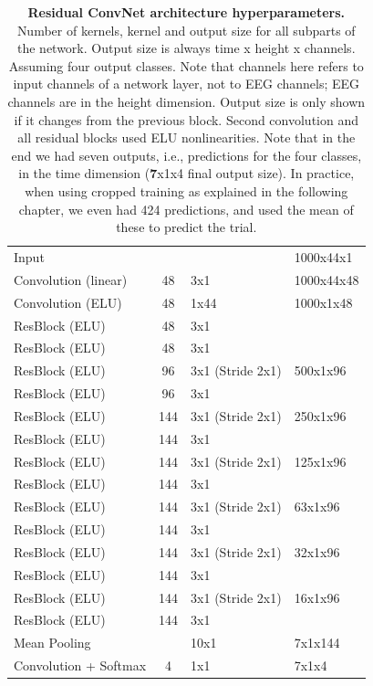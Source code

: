 \begin{table}[h!tb]
    \small
    \myfloatalign
    \begin{tabularx}{\textwidth}{lS[table-format=3.0]ll} 
    \toprule
         & 
        &  &  \\ 
    \midrule
    Input & & & 1000x44x1 \\
    Convolution (linear) & 48 & 3x1 & 1000x44x48 \\
    Convolution (ELU) & 48 & 1x44 & 1000x1x48 \\
    ResBlock (ELU) & 48 & 3x1 & \\
    ResBlock (ELU) & 48 & 3x1 & \\
    ResBlock (ELU) & 96 & 3x1 (Stride 2x1) & 500x1x96 \\
    ResBlock (ELU) & 96 & 3x1 & \\
    ResBlock (ELU) & 144 & 3x1 (Stride 2x1) & 250x1x96 \\
    ResBlock (ELU) & 144 & 3x1 & \\
    ResBlock (ELU) & 144 & 3x1 (Stride 2x1) & 125x1x96 \\
    ResBlock (ELU) & 144 & 3x1 & \\
    ResBlock (ELU) & 144 & 3x1 (Stride 2x1) & 63x1x96 \\
    ResBlock (ELU) & 144 & 3x1 & \\
    ResBlock (ELU) & 144 & 3x1 (Stride 2x1) & 32x1x96 \\
    ResBlock (ELU) & 144 & 3x1 & \\
    ResBlock (ELU) & 144 & 3x1 (Stride 2x1) & 16x1x96 \\
    ResBlock (ELU) & 144 & 3x1 & \\
    Mean Pooling & & 10x1 & 7x1x144 \\
    Convolution + Softmax & 4 & 1x1 & 7x1x4 \\
        \bottomrule
    \end{tabularx}
    \caption[Residual ConvNet architecture hyperparameters.]{\textbf{Residual ConvNet architecture hyperparameters.}
Number of kernels, kernel and output size for all subparts of the
network. Output size is always time x height x channels. Assuming four output classes. Note that
channels here refers to input channels of a network layer, not to EEG
channels; EEG channels are in the height dimension. Output size is only
shown if it changes from the previous block. Second convolution and all
residual blocks used ELU nonlinearities. Note that in the end we had
seven outputs, i.e., predictions for the four classes, in the time
dimension (\textbf{7}x1x4 final output size). In practice, when using
cropped training as explained in the following chapter, we even had 424
predictions, and used the mean of these to predict the trial.}  
\label{residual-architectures-table}
\end{table}

